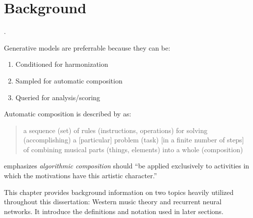 \chapter{Background}

\ifpdf
    \graphicspath{{Chapter2/Figs/Raster/}{Chapter2/Figs/PDF/}{Chapter2/Figs/}}
\else
    \graphicspath{{Chapter2/Figs/Vector/}{Chapter2/Figs/}}
\fi


.


Generative models are preferrable because they can be:
\begin{enumerate}
  \item Conditioned for harmonization
  \item Sampled for automatic composition
  \item Queried for analysis/scoring
\end{enumerate}
Automatic composition is described by \citet{papadopoulos1999ai} as:
\begin{quote}
  a sequence (set) of rules (instructions, operations) for solving (accomplishing) a [particular] problem (task)
  [in a finite number of steps] of combining musical parts (things, elements) into a whole (composition)
\end{quote}
\citet{pearce2002motivations} emphasizes \emph{algorithmic composition} should ``be applied exclusively
to activities in which the motivations have this artistic character.''




This chapter provides background information on two topics heavily utilized
throughout this dissertation: Western music theory and recurrent neural
networks. It introduce the definitions and notation used in later sections.

